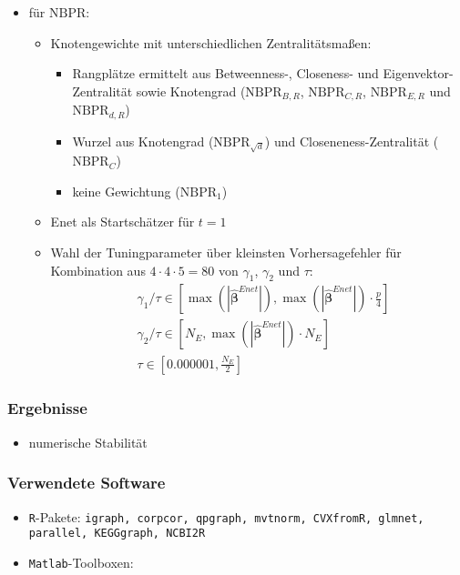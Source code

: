 \documentclass{beamer}
\begin{document}
\begin{frame}
	\begin{itemize}
	\item für $\text{NBPR}$:
	\begin{itemize}
	\item Knotengewichte mit unterschiedlichen Zentralitätsmaßen:
	\begin{itemize}
	\item Rangplätze ermittelt aus Betweenness-, Closeness- und Eigenvektor-Zentralität sowie Knotengrad ($\text{NBPR}_{B,R}$, $\text{NBPR}_{C,R}$, $\text{NBPR}_{E,R}$ und $\text{NBPR}_{d,R}$)
	\item Wurzel aus Knotengrad ($\text{NBPR}_{\sqrt{d}}$) und Closeneness-Zentralität ($\text{NBPR}_{C}$)
	\item keine Gewichtung ($\text{NBPR}_{1}$)
	\end{itemize}
	\item Enet als Startschätzer für $t=1$
	\item Wahl der Tuningparameter über kleinsten Vorhersagefehler für Kombination aus $4\cdot 4 \cdot 5 =80$ von $\gamma_1$, $\gamma_2$ und $\tau$:
	\begin{align*}
	&\gamma_1/\tau \in \left[ \max(|\boldsymbol{\hat{\beta}}^{Enet}|), \max(|\boldsymbol{\hat{\beta}}^{Enet}|) \cdot \frac{p}{4} \right] \\
	&\gamma_2/\tau \in \left[ N_E, \max(|\boldsymbol{\hat{\beta}}^{Enet}|) \cdot N_E \right]\\
	&\tau \in \left[0.000001, \frac{N_E}{2}\right]
	\end{align*}
	\end{itemize}
	\end{itemize}
\end{frame}


\begin{frame}
	\frametitle{Ergebnisse}
	\begin{itemize}
	\item numerische Stabilität
	\end{itemize}
\end{frame}



\begin{frame}
	\frametitle{Verwendete Software}
	\begin{itemize}
	\item \texttt{R}-Pakete: \texttt{igraph, corpcor, qpgraph, mvtnorm, CVXfromR, glmnet, parallel, KEGGgraph, NCBI2R}
	\item \texttt{Matlab}-Toolboxen: 
	\end{itemize}
\end{frame}


%
%


%
\end{document}

